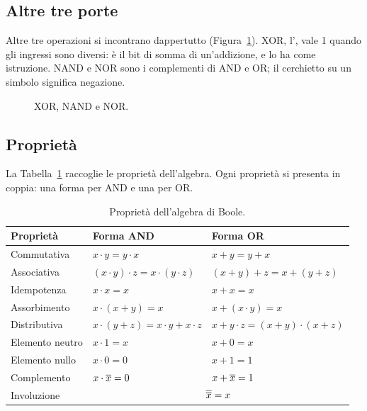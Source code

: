 \subsection{Altre tre porte}

Altre tre operazioni si incontrano dappertutto (Figura~\ref{fig:b1:gates2}).
XOR, l', vale 1 quando gli ingressi sono diversi: è il bit
di somma di un'addizione, e \riscv lo ha come istruzione. NAND e NOR sono i
complementi di AND e OR; il cerchietto su un simbolo significa negazione.

\begin{figure}[htb]
\centering
{}\hfill
{}\hfill
{}
\caption{XOR, NAND e NOR.}
\label{fig:b1:gates2}
\end{figure}

\subsection{Proprietà}

La Tabella~\ref{tab:b1:props} raccoglie le proprietà dell'algebra. Ogni
proprietà si presenta in coppia: una forma per AND e una per OR.

\begin{table}[htb]
\centering\small
\caption{Proprietà dell'algebra di Boole.}\label{tab:b1:props}
\begin{tabular}{@{}lll@{}}
\toprule
\textbf{Proprietà} & \textbf{Forma AND} & \textbf{Forma OR}\\
\midrule
Commutativa & $x\cdot y=y\cdot x$ & $x+y=y+x$\\
Associativa & $(x\cdot y)\cdot z=x\cdot(y\cdot z)$ & $(x+y)+z=x+(y+z)$\\
Idempotenza & $x\cdot x=x$ & $x+x=x$\\
Assorbimento & $x\cdot(x+y)=x$ & $x+(x\cdot y)=x$\\
Distributiva & $x\cdot(y+z)=x\cdot y+x\cdot z$ & $x+y\cdot z=(x+y)\cdot(x+z)$\\
Elemento neutro & $x\cdot 1=x$ & $x+0=x$\\
Elemento nullo & $x\cdot 0=0$ & $x+1=1$\\
Complemento & $x\cdot\overline{x}=0$ & $x+\overline{x}=1$\\
Involuzione & \multicolumn{2}{c}{$\overline{\overline{x}}=x$}\\
\bottomrule
\end{tabular}
\end{table}

